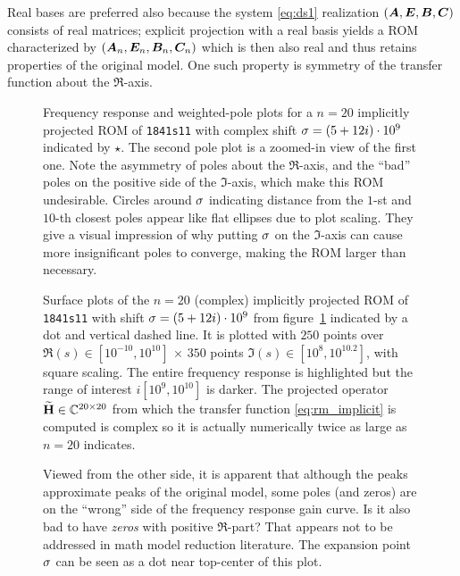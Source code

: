 Real bases are preferred also because the system \eqref{eq:ds1} realization $(\bm{A},\bm{E},\bm{B},\bm{C})$ consists of real matrices; explicit projection with a real basis yields a ROM characterized by $(\bm{A}_n, \bm{E}_n, \bm{B}_n, \bm{C}_n)$ which is then also real and thus retains properties of the original model.  One such property is symmetry of the transfer function about the $\Re$-axis.
\begin{figure}
\centering
{}
\vfill
{}
\vfill
{}
\caption{\label{fig:1841s11_imp_20_1}Frequency response and weighted-pole plots for a $n=20$ implicitly projected ROM of \texttt{1841s11} with complex shift $\sigma=(5+12i)\cdot10^{9}$ indicated by $\star$.  The second pole plot is a zoomed-in view of the first one.  Note the asymmetry of poles about the $\Re$-axis, and the ``bad'' poles on the positive side of the $\Im$-axis, which make this ROM undesirable.  Circles around $\sigma$ indicating distance from the $1$-st and $10$-th closest poles appear like flat ellipses due to plot scaling.  They give a visual impression of why putting $\sigma$ on the $\Im$-axis can cause more insignificant poles to converge, making the ROM larger than necessary.}
\end{figure}

\begin{figure}
\centering
{}
\caption{Surface plots of the $n=20$ (complex) implicitly projected ROM of \texttt{1841s11} with shift $\sigma=(5+12i)\cdot10^{9}$ from figure~\ref{fig:1841s11_imp_20_1} indicated by a dot and vertical dashed line.  It is plotted with $250$ points over $\Re(s)\in[10^{-10},10^{10}]$ $\times$ $350$ points $\Im(s)\in[10^8, 10^{10.2}]$, with square scaling. The entire frequency response is highlighted but the range of interest $i[10^9,10^{10}]$ is darker.  The projected operator $\widetilde{\textbf{\textup{H}}}\in\mathbb{C}^{20\times 20}$ from which the transfer function \eqref{eq:rm_implicit} is computed is complex so it is actually numerically twice as large as $n=20$ indicates.}
\vfill
{}
\caption{Viewed from the other side, it is apparent that although the peaks approximate peaks of the original model, some poles (and zeros) are on the ``wrong'' side of the frequency response gain curve. Is it also bad to have \emph{zeros} with positive $\Re$-part? That appears not to be addressed in math model reduction literature.  The expansion point $\sigma$ can be seen as a dot near top-center of this plot.}
\vfill
\end{figure}


